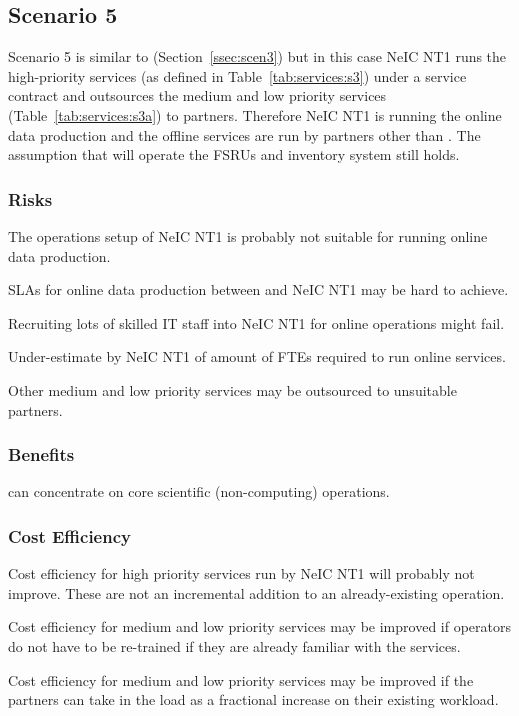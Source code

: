 \documentclass[12pt,a4paper]{article}
\newcommand{\nnt}{NeIC NT1\xspace}
\begin{document}
\subsection{Scenario 5}
\label{ssec:scen5}

Scenario 5 is similar to (Section~\ref{ssec:scen3}) but in this case \nnt runs the high-priority services (as defined in Table~\ref{tab:services:s3}) under a
service contract and \EC outsources the medium and low priority services (Table~\ref{tab:services:s3a}) to partners.
Therefore NeIC NT1 is running the online data production and the offline services are run by partners other than \EC.
The assumption that \EC will operate the FSRUs and inventory system still holds.

\subsubsection*{Risks}
\bitm
  \item The operations setup of NeIC NT1 is probably not suitable for running online data production.
  \item SLAs for online data production between \ESA and \nnt may be hard to achieve.
  \item Recruiting lots of skilled IT staff into \nnt for online operations might fail.
  \item Under-estimate by \nnt of amount of FTEs required to run online services.
  \item Other medium and low priority services may be outsourced to unsuitable partners.
\eitm

\subsubsection*{Benefits}
\bitm
\item \EC can concentrate on core scientific (non-computing) operations.
\eitm

\subsubsection*{Cost Efficiency}
\bitm
\item Cost efficiency for high priority services run by \nnt will probably not improve.
  These are not an incremental addition to an already-existing operation.
  \item Cost efficiency for medium and low priority services may be improved if operators do not have to be re-trained if they are already familiar with the services.
  \item Cost efficiency for medium and low priority services may be improved if the partners can take in the \ED load as a fractional increase on their existing workload.
\eitm
\end{document}
